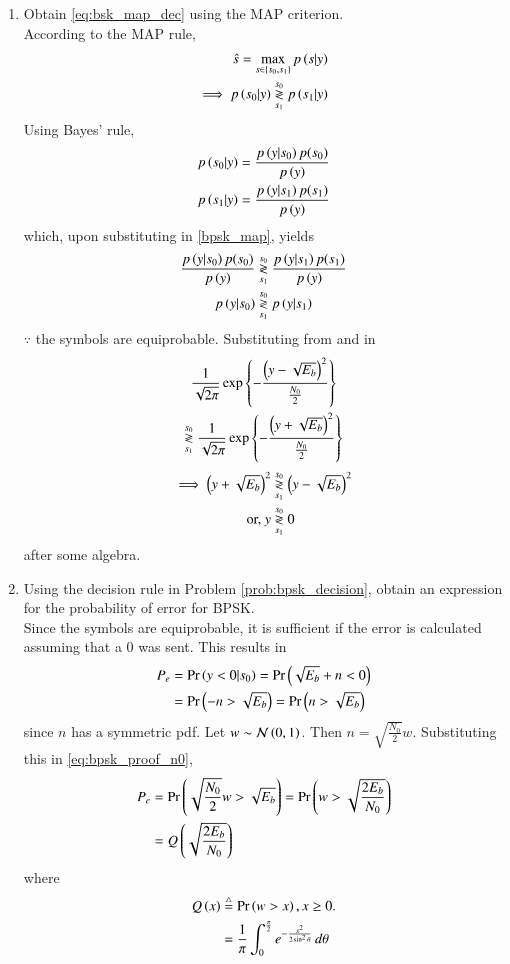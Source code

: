\documentclass[journal,12pt,twocolumn]{IEEEtran}
\renewcommand\thesection{\arabic{section}}
\begin{document}
\begin{enumerate}[label=\thesection.\arabic*.,ref=\thesection.\theenumi]
\item Obtain \eqref{eq:bsk_map_dec} using the MAP criterion.
\\
\solution According to the MAP rule, 
\begin{align}
\hat{s} = \max_{s \in \left\{s_0,s_1\right\}} p\left(s|y\right)
\\
\implies  p\left(s_0|y\right) \overset{s_0}{\underset{s_1}{\gtrless}}  p\left(s_1|y\right)
\label{bpsk_map}
\end{align}
%
Using Bayes' rule, 
\begin{align}
 p\left(s_0|y\right) &= \frac{p\left(y|s_0\right)p(s_0)}{p\left(y\right)}
\\
 p\left(s_1|y\right) &= \frac{p\left(y|s_1\right)p(s_1)}{p\left(y\right)}
\end{align}
%
which, upon substituting in \eqref{bpsk_map}, yields
\begin{align}
\frac{p\left(y|s_0\right)p(s_0)}{p\left(y\right)} &\overset{s_0}{\underset{s_1}{\gtrless}} \frac{p\left(y|s_1\right)p(s_1)}{p\left(y\right)}
\\
p\left(y|s_0\right)&\overset{s_0}{\underset{s_1}{\gtrless}} p\left(y|s_1\right)
\label{bpsk_ml}
\end{align}
%
$\because$ the symbols are equiprobable. Substituting from \label{eq:bpsk_y0pdf} and \label{eq:bpsk_y1pdf} in \label{bpsk_ml} 
%
\begin{multline}
\frac{1}{\sqrt{2\pi}}\exp\left\{-\frac{\left(y - \sqrt{E_b}\right)^2}{\frac{N_0}{2}}\right\} 
\\
\overset{s_0}{\underset{s_1}{\gtrless}} \frac{1}{\sqrt{2\pi}}\exp\left\{-\frac{\left(y + \sqrt{E_b}\right)^2}{\frac{N_0}{2}}\right\}
\end{multline}
\begin{align}
\implies \left(y + \sqrt{E_b}\right)^2 &\overset{s_0}{\underset{s_1}{\gtrless}} \left(y - \sqrt{E_b}\right)^2
\\
\text{or, } y &\overset{s_0}{\underset{s_1}{\gtrless}} 0
\end{align}
%
after some algebra.
%
\item
Using the decision rule in Problem \ref{prob:bpsk_decision}, obtain an expression for the probability of error for BPSK.
\\
\solution
Since the symbols are equiprobable, it is sufficient if the error is calculated assuming that a 0 was sent.  This results in
\begin{align}
P_e &= \Pr\left(y < 0|s_0\right) = \Pr\left(\sqrt{E_b} + n < 0\right)
\\
&= \Pr\left( -n > \sqrt{E_b} \right) = \Pr\left( n > \sqrt{E_b} \right)
\label{eq:bpsk_proof_n0}
\end{align}
since $n$ has a symmetric pdf.
Let $w \sim \mathcal{N}\left(0,1\right)$.  Then $n = \sqrt{\frac{N_0}{2}}w$. Substituting this in \eqref{eq:bpsk_proof_n0},
\begin{align}
P_e &=  \Pr\left( \sqrt{\frac{N_0}{2}}w > \sqrt{E_b} \right) = \Pr\left( w > \sqrt{\frac{2E_b}{N_0}} \right)
\\
&= Q\left(\sqrt{\frac{2E_b}{N_0}}\right)
\end{align}
%
where 
\begin{align}
\label{eq:qfunc_def}
Q\left(x\right) &\stackrel{\triangle}{=} \Pr\left(w > x\right), x \ge 0 .
\\
&= \frac{1}{\pi}\int^{\frac{\pi}{2}}_{0}e^{-\frac{x^2}{2\sin^2 \theta}}\,d\theta
\end{align}


\end{enumerate}
\end{document}

